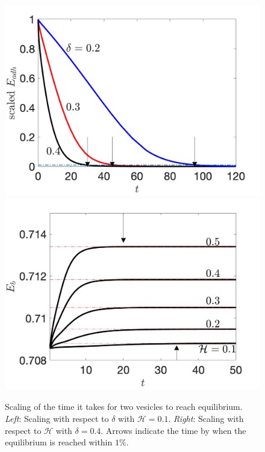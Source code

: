 \documentclass[prf,superscriptaddress,showpacs]{revtex4-1}
\begin{document}
\begin{figure}
\includegraphics[keepaspectratio=true,scale=0.4]{figs/Dec13a_time_scaling01.png}
\includegraphics[keepaspectratio=true,scale=0.4]{figs/Dec13a_time_scaling02.png}
\caption{\label{fig:qflow00} Scaling of the time it takes for two
  vesicles to reach equilibrium. {\em Left}: Scaling with respect to
  $\delta$ with $\mathcal{H}=0.1$.  {\em Right}: Scaling with respect to
  $\mathcal{H}$ with
  $\delta = 0.4$. Arrows indicate the time by when the equilibrium is
  reached within $1\%$.}
\end{figure}
\end{document}
